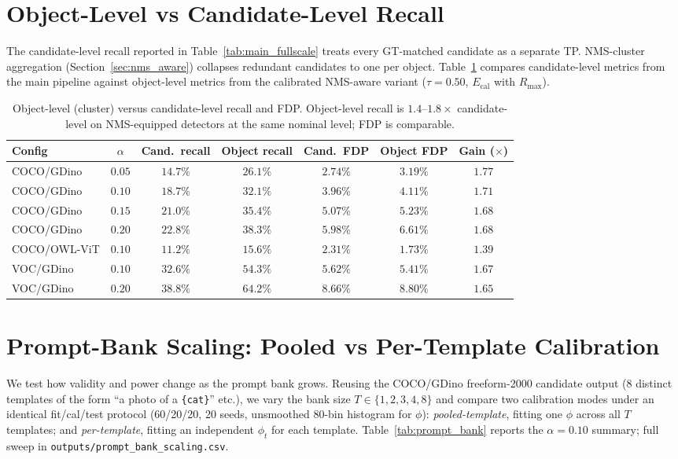 \documentclass{article}
\theoremstyle{remark}
\newcommand{\1}{\mathbf{1}}
\begin{document}
\section{Object-Level vs Candidate-Level Recall}
\label{app:obj_vs_cand}

The candidate-level recall reported in Table~\ref{tab:main_fullscale}
treats every GT-matched candidate as a separate TP. NMS-cluster
aggregation (Section~\ref{sec:nms_aware}) collapses redundant
candidates to one per object. Table~\ref{tab:obj_vs_cand} compares
candidate-level metrics from the main pipeline against object-level
metrics from the calibrated NMS-aware variant
($\tau\!=\!0.50$, $E_{\mathrm{cal}}$ with $R_{\max}$).

\begin{table}[h]
\centering
\small
\begin{tabular*}{\linewidth}{@{\extracolsep{\fill}}lcccccc@{}}
\toprule
Config & $\alpha$ & Cand.\ recall & Object recall & Cand.\ FDP & Object FDP & Gain ($\times$) \\
\midrule
COCO/GDino   & $0.05$ & $14.7\%$ & $26.1\%$ & $2.74\%$ & $3.19\%$ & $1.77$ \\
COCO/GDino   & $0.10$ & $18.7\%$ & $32.1\%$ & $3.96\%$ & $4.11\%$ & $1.71$ \\
COCO/GDino   & $0.15$ & $21.0\%$ & $35.4\%$ & $5.07\%$ & $5.23\%$ & $1.68$ \\
COCO/GDino   & $0.20$ & $22.8\%$ & $38.3\%$ & $5.98\%$ & $6.61\%$ & $1.68$ \\
COCO/OWL-ViT & $0.10$ & $11.2\%$ & $15.6\%$ & $2.31\%$ & $1.73\%$ & $1.39$ \\
VOC/GDino    & $0.10$ & $32.6\%$ & $54.3\%$ & $5.62\%$ & $5.41\%$ & $1.67$ \\
VOC/GDino    & $0.20$ & $38.8\%$ & $64.2\%$ & $8.66\%$ & $8.80\%$ & $1.65$ \\
\bottomrule
\end{tabular*}
\caption{Object-level (cluster) versus candidate-level recall and FDP.
Object-level recall is $1.4$--$1.8\times$ candidate-level on
NMS-equipped detectors at the same nominal level; FDP is comparable.}
\label{tab:obj_vs_cand}
\end{table}

\section{Prompt-Bank Scaling: Pooled vs Per-Template Calibration}
\label{app:prompt_bank}

We test how validity and power change as the prompt bank grows.
Reusing the COCO/GDino freeform-2000 candidate output (8 distinct
templates of the form ``a photo of a {\tt\{cat\}}'' etc.), we vary
the bank size $T \in \{1, 2, 3, 4, 8\}$ and compare two calibration
modes under an identical fit/cal/test protocol (60/20/20, 20 seeds,
unsmoothed 80-bin histogram for $\phi$):
\emph{pooled-template}, fitting one $\phi$ across all $T$ templates;
and \emph{per-template}, fitting an independent $\phi_t$ for each
template. Table~\ref{tab:prompt_bank} reports the
$\alpha\!=\!0.10$ summary; full sweep in
\texttt{outputs/prompt\_bank\_scaling.csv}.
\end{document}
